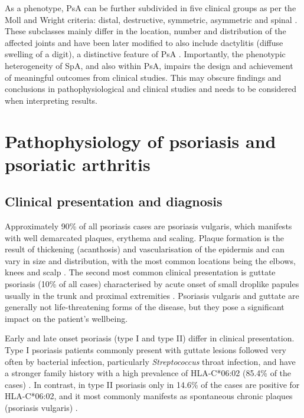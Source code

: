 As a phenotype, PsA can be further subdivided in five clinical groups as per the Moll and Wright criteria: distal, destructive, symmetric, asymmetric and spinal \parencite{Moll1973}. These subclasses mainly differ in the location, number and distribution of the affected joints and have been later modified to also include dactylitis (diffuse swelling of a digit), a distinctive feature of PsA \parencite{Reich2012}. Importantly, the phenotypic heterogeneity of SpA, and also within PsA, impairs the design and achievement of meaningful outcomes from clinical studies. This may obscure findings and conclusions in pathophysiological and clinical studies and needs to be considered when interpreting results.



\section{Pathophysiology of psoriasis and psoriatic arthritis}

\subsection{Clinical presentation and diagnosis}
%
Approximately 90\% of all psoriasis cases are psoriasis vulgaris, which manifests with well demarcated plaques, erythema and scaling. Plaque formation is the result of thickening (acanthosis) and vascularisation of the epidermis and can vary in size and distribution, with the most common locations being the elbows, knees and scalp \parencite{Perera2012,Griffiths2007}. The second most common clinical presentation is guttate psoriasis  (10\% of all cases) characterised by acute onset of small droplike papules usually in the trunk and proximal extremities \parencite{Vence2015}. Psoriasis vulgaris and guttate are generally not life-threatening forms of the disease, but they pose a significant impact on the patient's wellbeing. 

Early and late onset psoriasis (type I and type II) differ in clinical presentation. Type I psoriasis patients commonly present with guttate lesions followed very often by bacterial infection, particularly \textit{Streptococcus} throat infection, and have a stronger family history with a high prevalence of HLA-C*06:02 (85.4\% of the cases) \parencite{Telfer1992}. In contrast, in type II psoriasis only in 14.6\% of the cases are positive for HLA-C*06:02, and it most commonly manifests as spontaneous chronic plaques (psoriasis vulgaris) \parencite{Perera2012}. 


